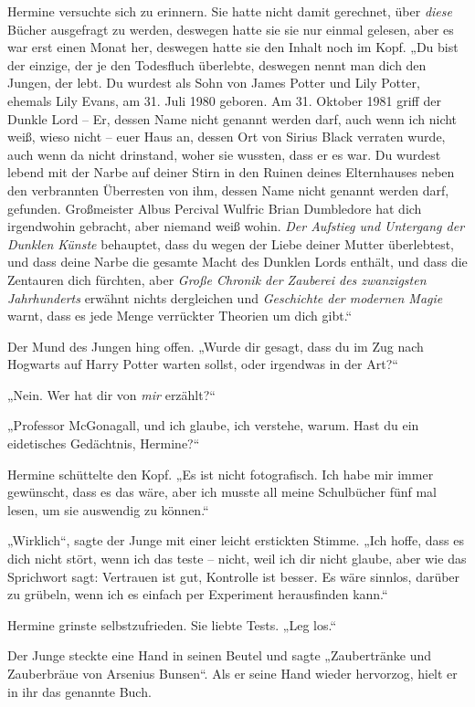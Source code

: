 {Hermine versuchte sich zu erinnern. Sie hatte nicht damit gerechnet, über \emph{diese} Bücher ausgefragt zu werden, deswegen hatte sie sie nur einmal gelesen, aber es war erst einen Monat her, deswegen hatte sie den Inhalt noch im Kopf. „Du bist der einzige, der je den Todesfluch überlebte, deswegen nennt man dich den Jungen, der lebt. Du wurdest als Sohn von James Potter und Lily Potter, ehemals Lily Evans, am 31. Juli 1980 geboren. Am 31. Oktober 1981 griff der Dunkle Lord -- Er, dessen Name nicht genannt werden darf, auch wenn ich nicht weiß, wieso nicht -- euer Haus an, dessen Ort von Sirius Black verraten wurde, auch wenn da nicht drinstand, woher sie wussten, dass er es war. Du wurdest lebend mit der Narbe auf deiner Stirn in den Ruinen deines Elternhauses neben den verbrannten Überresten von ihm, dessen Name nicht genannt werden darf, gefunden. Großmeister Albus Percival Wulfric Brian Dumbledore hat dich irgendwohin gebracht, aber niemand weiß wohin. \emph{Der Aufstieg und Untergang der Dunklen Künste} behauptet, dass du wegen der Liebe deiner Mutter überlebtest, und dass deine Narbe die gesamte Macht des Dunklen Lords enthält, und dass die Zentauren dich fürchten, aber \emph{Große Chronik der Zauberei des zwanzigsten Jahrhunderts} erwähnt nichts dergleichen und \emph{Geschichte der modernen Magie} warnt, dass es jede Menge verrückter Theorien um dich gibt.“

Der Mund des Jungen hing offen. „Wurde dir gesagt, dass du im Zug nach Hogwarts auf Harry Potter warten sollst, oder irgendwas in der Art?“

„Nein. Wer hat dir von \emph{mir} erzählt?“

„Professor McGonagall, und ich glaube, ich verstehe, warum. Hast du ein eidetisches Gedächtnis, Hermine?“

Hermine schüttelte den Kopf. „Es ist nicht fotografisch. Ich habe mir immer gewünscht, dass es das wäre, aber ich musste all meine Schulbücher fünf mal lesen, um sie auswendig zu können.“

„Wirklich“, sagte der Junge mit einer leicht erstickten Stimme. „Ich hoffe, dass es dich nicht stört, wenn ich das teste -- nicht, weil ich dir nicht glaube, aber wie das Sprichwort sagt: Vertrauen ist gut, Kontrolle ist besser. Es wäre sinnlos, darüber zu grübeln, wenn ich es einfach per Experiment herausfinden kann.“

Hermine grinste selbstzufrieden. Sie liebte Tests. „Leg los.“

Der Junge steckte eine Hand in seinen Beutel und sagte „Zaubertränke und Zauberbräue von Arsenius Bunsen“. Als er seine Hand wieder hervorzog, hielt er in ihr das genannte Buch.

}
